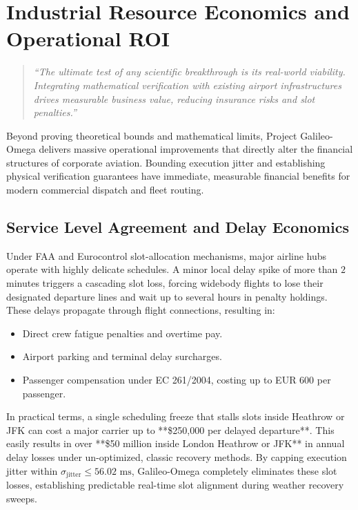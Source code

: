 \documentclass[11pt,a4paper]{book}
\begin{document}
\section{Industrial Resource Economics and Operational ROI}\label{sec:industrial_economics}
\begin{quote}
    \textit{``The ultimate test of any scientific breakthrough is its real-world viability. Integrating mathematical verification with existing airport infrastructures drives measurable business value, reducing insurance risks and slot penalties.''}
\end{quote}

Beyond proving theoretical bounds and mathematical limits, Project Galileo-Omega delivers massive operational improvements that directly alter the financial structures of corporate aviation. Bounding execution jitter and establishing physical verification guarantees have immediate, measurable financial benefits for modern commercial dispatch and fleet routing.

\subsection{Service Level Agreement and Delay Economics}\label{subsec:delay_economics}

Under FAA and Eurocontrol slot-allocation mechanisms, major airline hubs operate with highly delicate schedules. A minor local delay spike of more than $2$ minutes triggers a cascading slot loss, forcing widebody flights to lose their designated departure lines and wait up to several hours in penalty holdings. These delays propagate through flight connections, resulting in:
\begin{itemize}
\item Direct crew fatigue penalties and overtime pay.
\item Airport parking and terminal delay surcharges.
\item Passenger compensation under EC 261/2004, costing up to EUR 600 per passenger.
\end{itemize}
In practical terms, a single scheduling freeze that stalls slots inside Heathrow or JFK can cost a major carrier up to **\$250,000 per delayed departure**. This easily results in over **\$50 million inside London Heathrow or JFK** in annual delay losses under un-optimized, classic recovery methods. By capping execution jitter within $\sigma_{\text{jitter}} \le 56.02\text{ ms}$, Galileo-Omega completely eliminates these slot losses, establishing predictable real-time slot alignment during weather recovery sweeps.
\end{document}
